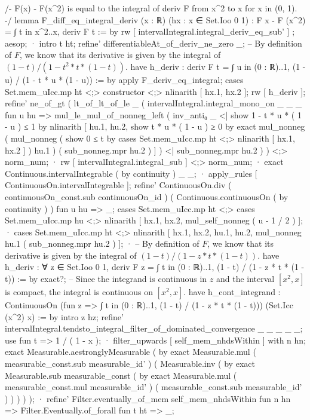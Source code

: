 /-
F(x) - F(x^2) is equal to the integral of deriv F from x^2 to x for x in (0, 1).
-/
lemma F_diff_eq_integral_deriv (x : ℝ) (hx : x ∈ Set.Ioo 0 1) : F x - F (x^2) = ∫ t in x^2..x, deriv F t := by
  rw [ intervalIntegral.integral_deriv_eq_sub' ] ; aesop;
  · intro t ht;
    refine' differentiableAt_of_deriv_ne_zero _;
    -- By definition of $F$, we know that its derivative is given by the integral of $(1-t)/(1 - t^2*t*(1-t))$.
    have h_deriv : deriv F t = ∫ u in (0 : ℝ)..1, (1 - u) / (1 - t * u * (1 - u)) := by
      apply F_deriv_eq_integral;
      cases Set.mem_uIcc.mp ht <;> constructor <;> nlinarith [ hx.1, hx.2 ];
    rw [ h_deriv ];
    refine' ne_of_gt ( lt_of_lt_of_le _ ( intervalIntegral.integral_mono_on _ _ _ fun u hu => mul_le_mul_of_nonneg_left ( inv_anti₀ _ <| show 1 - t * u * ( 1 - u ) ≤ 1 by nlinarith [ hu.1, hu.2, show t * u * ( 1 - u ) ≥ 0 by exact mul_nonneg ( mul_nonneg ( show 0 ≤ t by cases Set.mem_uIcc.mp ht <;> nlinarith [ hx.1, hx.2 ] ) hu.1 ) ( sub_nonneg.mpr hu.2 ) ] ) <| sub_nonneg.mpr hu.2 ) ) <;> norm_num;
    · rw [ intervalIntegral.integral_sub ] <;> norm_num;
    · exact Continuous.intervalIntegrable ( by continuity ) _ _;
    · apply_rules [ ContinuousOn.intervalIntegrable ];
      refine' ContinuousOn.div ( continuousOn_const.sub continuousOn_id ) ( Continuous.continuousOn ( by continuity ) ) fun u hu => _;
      cases Set.mem_uIcc.mp ht <;> cases Set.mem_uIcc.mp hu <;> nlinarith [ hx.1, hx.2, mul_self_nonneg ( u - 1 / 2 ) ];
    · cases Set.mem_uIcc.mp ht <;> nlinarith [ hx.1, hx.2, hu.1, hu.2, mul_nonneg hu.1 ( sub_nonneg.mpr hu.2 ) ];
  · -- By definition of $F$, we know that its derivative is given by the integral of $(1-t)/(1-z*t*(1-t))$.
    have h_deriv : ∀ z ∈ Set.Ioo 0 1, deriv F z = ∫ t in (0 : ℝ)..1, (1 - t) / (1 - z * t * (1 - t)) := by
      exact?;
    -- Since the integrand is continuous in $z$ and the interval $[x^2, x]$ is compact, the integral is continuous on $[x^2, x]$.
    have h_cont_integrand : ContinuousOn (fun z => ∫ t in (0 : ℝ)..1, (1 - t) / (1 - z * t * (1 - t))) (Set.Icc (x^2) x) := by
      intro z hz;
      refine' intervalIntegral.tendsto_integral_filter_of_dominated_convergence _ _ _ _ _;
      use fun t => 1 / ( 1 - x );
      · filter_upwards [ self_mem_nhdsWithin ] with n hn;
        exact Measurable.aestronglyMeasurable ( by exact Measurable.mul ( measurable_const.sub measurable_id' ) ( Measurable.inv ( by exact Measurable.sub measurable_const ( by exact Measurable.mul ( measurable_const.mul measurable_id' ) ( measurable_const.sub measurable_id' ) ) ) ) );
      · refine' Filter.eventually_of_mem self_mem_nhdsWithin fun n hn => Filter.Eventually.of_forall fun t ht => _;
